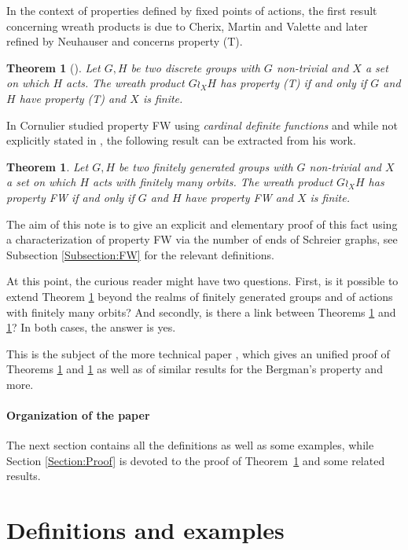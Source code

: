 \documentclass[a4paper]{article}
\newtheorem{thm}[lem]{Theorem}
\theoremstyle{definition}
\theoremstyle{remark}
\begin{document}
In the context of properties defined by fixed points of actions, the first result concerning wreath products is due to Cherix, Martin and Valette and later refined by Neuhauser and concerns property (T).
%
%
\begin{thm}[\cite{Cherix2004,Neuhauser2005a}] \label{T:Wreath_prop_T}
Let $G,H$ be two discrete groups with $G$ non-trivial and $X$ a set on which $H$ acts. The wreath product $G \wr_X H$ has property (T) if and only if $G$ and $H$ have property (T) and $X$ is finite.
\end{thm}
%
%
In \cite{Cornulier2013} Cornulier studied property FW using \emph{cardinal definite functions} and while not explicitly stated in \cite{Cornulier2013}, the following result can be extracted from his work.
%
%
\begin{thm}\label{Thm:Main}
Let $G,H$ be two finitely generated groups with $G$ non-trivial and $X$ a set on which $H$ acts with finitely many orbits. The wreath product $G \wr_X H$ has property FW if and only if $G$ and $H$ have property FW and $X$ is finite.
\end{thm}
%
%
The aim of this note is to give an explicit and elementary proof of this fact using a characterization of property FW via the number of ends of Schreier graphs, see Subsection \ref{Subsection:FW} for the relevant definitions.


At this point, the curious reader might have two questions. First, is it possible to extend Theorem \ref{Thm:Main} beyond the realms of finitely generated groups and of actions with finitely many orbits? And secondly, is there a link between Theorems \ref{T:Wreath_prop_T} and \ref{Thm:Main}?
In both cases, the answer is yes.

This is the subject of the more technical paper \cite{LS2021}, which gives an unified proof of Theorems \ref{T:Wreath_prop_T} and \ref{Thm:Main} as well as of similar results for the Bergman's property and more.
%

\paragraph{Organization of the paper}
The next section contains all the definitions as well as some examples, while Section \ref{Section:Proof} is devoted to the proof of Theorem~\ref{Thm:Main} and some related results.
%
\section{Definitions and examples}
\end{document}
